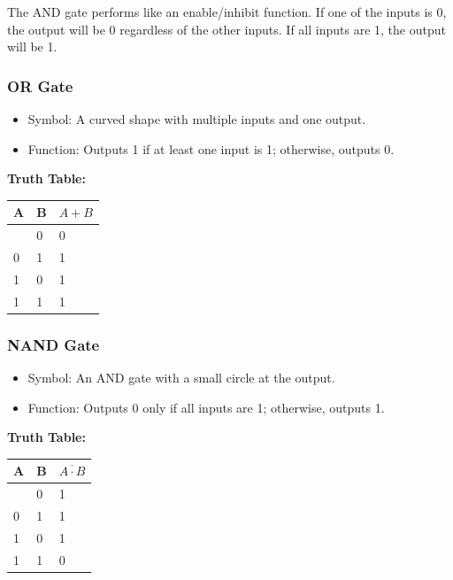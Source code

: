 \documentclass[11pt,a4paper]{article}
\providecommand{\tightlist}{\setlength{\itemsep}{1pt}\setlength{\parskip}{0pt}}
\begin{document}
The AND gate performs like an enable/inhibit function. If one of the
inputs is 0, the output will be 0 regardless of the other inputs. If all
inputs are 1, the output will be 1.

\subsubsection{OR Gate}\label{or-gate}

\begin{itemize}
\tightlist
\item
  Symbol: A curved shape with multiple inputs and one output.
\item
  Function: Outputs 1 if at least one input is 1; otherwise, outputs 0.
\end{itemize}

\textbf{Truth Table:}

\begin{longtable}[]{@{}lll@{}}
\toprule\noalign{}
A & B & \(A + B\) \\
\midrule\noalign{}
\endhead
\bottomrule\noalign{}
\endlastfoot
0 & 0 & 0 \\
0 & 1 & 1 \\
1 & 0 & 1 \\
1 & 1 & 1 \\
\end{longtable}

\subsubsection{NAND Gate}\label{nand-gate}

\begin{itemize}
\tightlist
\item
  Symbol: An AND gate with a small circle at the output.
\item
  Function: Outputs 0 only if all inputs are 1; otherwise, outputs 1.
\end{itemize}

\textbf{Truth Table:}

\begin{longtable}[]{@{}lll@{}}
\toprule\noalign{}
A & B & \(\overline{A \cdot B}\) \\
\midrule\noalign{}
\endhead
\bottomrule\noalign{}
\endlastfoot
0 & 0 & 1 \\
0 & 1 & 1 \\
1 & 0 & 1 \\
1 & 1 & 0 \\
\end{longtable}
\end{document}
